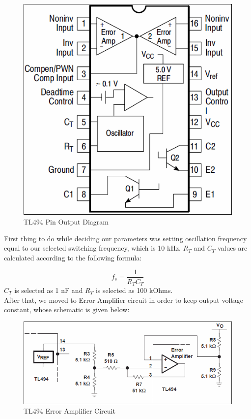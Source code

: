\documentclass{article}
\newcommand\tab[1][1cm]{\hspace*{#1}}
\begin{document}
\begin{figure}[H]
    \centering
    \includegraphics[scale=0.2]{tl494.png}
    \caption{TL494 Pin Output Diagram}
    \label{fig:my_label}
\end{figure}

\tab First thing to do while deciding our parameters was setting oscillation frequency equal to our selected switching frequency, which is 10 kHz. $R_T$ and $C_T$ values are calculated according to the following formula:

\begin{equation*}
    f_s=\frac{1}{R_TC_T}
\end{equation*}
$C_T$ is selected as 1 nF and $R_T$ is selected as 100 kOhms.  \\
After that, we moved to Error Amplifier circuit in order to keep output voltage constant, whose schematic is given below:

\begin{figure}[H]
    \centering
    \includegraphics[scale=0.5]{error.png}
    \caption{TL494 Error Amplifier Circuit}
    \label{fig:my_label}
\end{figure}
\end{document}
